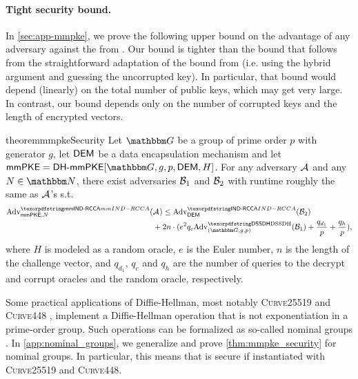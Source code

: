 \paragraph{Tight security bound.}
In \cref{sec:app-mmpke}, we prove the following upper bound on the advantage of any adversary against the \mmPKE from \cite{ASIACCS:PinPoeSch14}. Our bound is tighter than the bound that follows from the straightforward adaptation of the bound from \cite{ASIACCS:PinPoeSch14} (i.e. using the hybrid argument and guessing the uncorrupted key). In particular, that bound would depend (linearly) on the total number of public keys, which may get very large. In contrast, our bound depends only on the number of corrupted keys and the length of encrypted vectors.

\begin{restatable}{theorem}{mmpkeSecurity}\label{thm:mmpke_security}
  Let $\Grp$ be a group of prime order $p$ with generator $g$, let $\dem$ be a data encapsulation mechanism and let
  $\mmPKE = \dhmmpke[\Grp, g, p, \dem, H]$. For any adversary $\Adv$ and any $N \in \N$, there exist adversaries $\Bdv[1]$ and $\Bdv[2]$ with runtime roughly the same as $\Adv$'s s.t.
  \begin{align*}
    \textnormal{Adv}^{\mmindrcca}_{\mmPKE, N}(& \Adv) \leq \adv{\indrcca}{\dem}({\Bdv[2]}) \\
                                              &+2n\cdot(e^2q_c \adv{\sdh}{(\Grp, g, p)}({\Bdv[1]}) + \frac{q_{d_1}}{p} + \frac{q_{h}}{p}),
  \end{align*}
  where $H$ is modeled as a random oracle, $e$
  is the Euler number, $n$ is the length of the challenge vector, and $q_{d_1}$, $q_c$ and $q_h$ are the number of queries to the decrypt and corrupt oracles and the random oracle, respectively.
\end{restatable}

\begin{remark}
Some practical applications of Diffie-Hellman, most notably \textsc{Curve25519} and \textsc{Curve448} \cite{rfc7748}, implement a Diffie-Hellman operation that is not exponentiation in a prime-order group. Such operations can be formalized as so-called nominal groups \cite{EC:ABHKLR21_2}. In \cref{app:nominal_groups}, we generalize and prove \cref{thm:mmpke_security} for nominal groups. In particular, this means that \dhmmpke is secure if instantiated with \textsc{Curve25519} and \textsc{Curve448}.
\end{remark}


